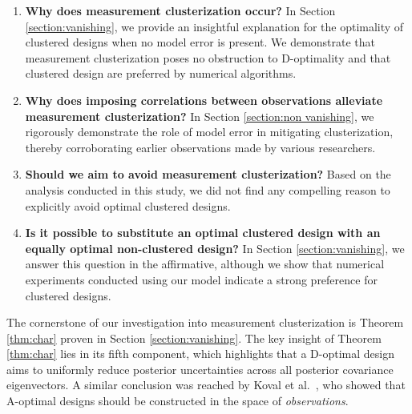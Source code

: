 \begin{enumerate}
\item \label{q:why} \textbf{Why does measurement clusterization
  occur?} In Section \ref{section:vanishing}, we provide an insightful
  explanation for the optimality of clustered designs when no model
  error is present. We demonstrate that measurement clusterization
  poses no obstruction to D-optimality and that clustered design are
  preferred by numerical algorithms.


\item \label{q:mitigate} \textbf{Why does imposing correlations
  between observations alleviate measurement clusterization?} In
  Section \ref{section:non vanishing}, we rigorously demonstrate the
  role of model error in mitigating clusterization, thereby
  corroborating earlier observations made by various researchers.

\item \label{q:avoid} \textbf{Should we aim to avoid measurement
  clusterization?} Based on the analysis conducted in this study, we
  did not find any compelling reason to explicitly avoid optimal
  clustered designs.

\item \label{q:replace} \textbf{Is it possible to substitute an
  optimal clustered design with an equally optimal non-clustered
  design?} In Section \ref{section:vanishing}, we answer this question
  in the affirmative, although we show that numerical experiments
  conducted using our model indicate a strong preference for clustered
  designs.
\end{enumerate}

The cornerstone of our investigation into measurement clusterization
is Theorem \ref{thm:char} proven in Section
\ref{section:vanishing}. The key insight of Theorem \ref{thm:char}
lies in its fifth component, which highlights that a D-optimal design
aims to uniformly reduce posterior uncertainties across all posterior
covariance eigenvectors. A similar conclusion was reached by Koval et
al.~\cite{koval2020}, who showed that A-optimal designs should be
constructed in the space of \emph{observations}.



